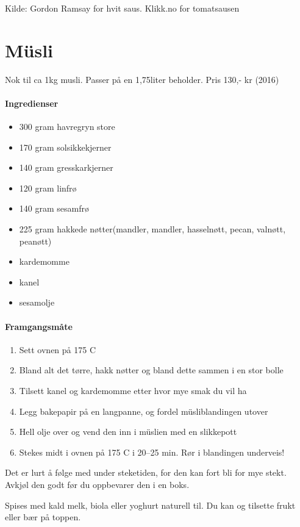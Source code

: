 \documentclass[12pt,a4paper]{book}
\begin{document}
{Kilde: Gordon Ramsay for hvit saus. Klikk.no for tomatsausen
\clearpage{}
\clearpage{}\section{﻿Müsli}
Nok til ca 1kg musli. Passer på en 1,75liter beholder.
Pris 130,- kr (2016)

\paragraph{Ingredienser}
\begin{itemize}[noitemsep]
	\item 300 gram havregryn store
	\item 170 gram solsikkekjerner
	\item 140 gram gresskarkjerner
	\item 120 gram linfrø
	\item 140 gram sesamfrø
	\item 225 gram hakkede nøtter(mandler, mandler, hasselnøtt, pecan, valnøtt, peanøtt)
	\item kardemomme
	\item kanel
	\item sesamolje
\end{itemize}

\paragraph{Framgangsmåte}
\begin{enumerate}[noitemsep]
	\item	Sett ovnen på 175 \degree C
	\item	Bland alt det tørre, hakk nøtter og bland dette sammen i en stor bolle
	\item	Tilsett kanel og kardemomme etter hvor mye smak du vil ha
	\item	Legg bakepapir på en langpanne, og fordel müsliblandingen utover
	\item	Hell olje over og vend den inn i müslien med en slikkepott
	\item	Stekes midt i ovnen på 175 \degree C i 20--25 min. Rør i blandingen underveis!
\end{enumerate}


Det er lurt å følge med under steketiden, for den kan fort bli for mye stekt.
Avkjøl den godt før du oppbevarer den i en boks.

Spises med kald melk, biola eller yoghurt naturell til. Du kan og tilsette frukt eller bær på toppen.

}
\end{document}
